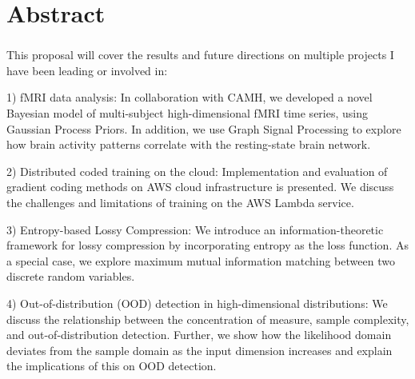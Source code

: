 \chapter*{Abstract} 
\subsection*{\thesistitle}

This proposal will cover the results and future directions on multiple projects I have been leading or involved in: 

1) fMRI data analysis: In collaboration with CAMH, we developed a novel Bayesian model of multi-subject high-dimensional fMRI time series, using Gaussian Process Priors. In addition, we use Graph Signal Processing to explore how brain activity patterns correlate with the resting-state brain network. 

2) Distributed coded training on the cloud: Implementation and evaluation of gradient coding methods on AWS cloud infrastructure is presented. We discuss the challenges and limitations of training on the AWS Lambda service. 

3) Entropy-based Lossy Compression: We introduce an information-theoretic framework for lossy compression by incorporating entropy as the loss function. As a special case, we explore maximum mutual information matching between two discrete random variables. 

4) Out-of-distribution (OOD) detection in high-dimensional distributions: We discuss the relationship between the concentration of measure, sample complexity, and out-of-distribution detection. Further, we show how the likelihood domain deviates from the sample domain as the input dimension increases and explain the implications of this on OOD detection. 

